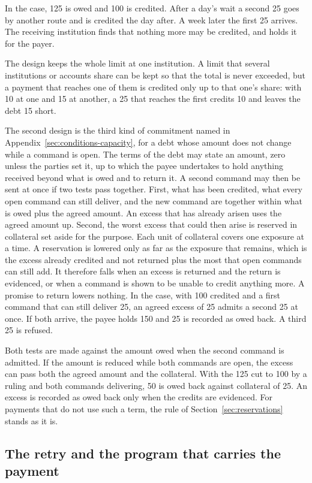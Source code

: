 \documentclass{momentum}
\begin{document}
In the case, 125 is owed and 100 is credited. After a day's wait a second 25 goes by another route and is credited the day after. A week later the first 25 arrives. The receiving institution finds that nothing more may be credited, and holds it for the payer.

The design keeps the whole limit at one institution. A limit that several institutions or accounts share can be kept so that the total is never exceeded, but a payment that reaches one of them is credited only up to that one's share: with 10 at one and 15 at another, a 25 that reaches the first credits 10 and leaves the debt 15 short.

The second design is the third kind of commitment named in Appendix~\ref{sec:conditions-capacity}, for a debt whose amount does not change while a command is open. The terms of the debt may state an amount, zero unless the parties set it, up to which the payee undertakes to hold anything received beyond what is owed and to return it. A second command may then be sent at once if two tests pass together. First, what has been credited, what every open command can still deliver, and the new command are together within what is owed plus the agreed amount. An excess that has already arisen uses the agreed amount up. Second, the worst excess that could then arise is reserved in collateral set aside for the purpose. Each unit of collateral covers one exposure at a time. A reservation is lowered only as far as the exposure that remains, which is the excess already credited and not returned plus the most that open commands can still add. It therefore falls when an excess is returned and the return is evidenced, or when a command is shown to be unable to credit anything more. A promise to return lowers nothing. In the case, with 100 credited and a first command that can still deliver 25, an agreed excess of 25 admits a second 25 at once. If both arrive, the payee holds 150 and 25 is recorded as owed back. A third 25 is refused.

Both tests are made against the amount owed when the second command is admitted. If the amount is reduced while both commands are open, the excess can pass both the agreed amount and the collateral. With the 125 cut to 100 by a ruling and both commands delivering, 50 is owed back against collateral of 25. An excess is recorded as owed back only when the credits are evidenced. For payments that do not use such a term, the rule of Section~\ref{sec:reservations} stands as it is.

\subsection{The retry and the program that carries the payment}
\label{sec:conditions-op}
\end{document}
